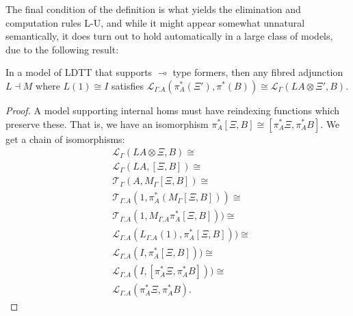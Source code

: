The final condition of the definition is what yields the elimination and computation rules L-U, and while it might appear somewhat unnatural semantically, it does turn out to hold automatically in a large class of models, due to the following result:
\begin{thm}In a model of LDTT that supports $\multimap$ type formers, then any fibred adjunction $L \dashv M$ where $L(1) \cong I$ satisfies $\mathcal{L}_{\Gamma.A}(\pi^*_A(\Xi'), \pi^*(B)) \cong \mathcal{L}_{\Gamma}(LA \otimes \Xi', B)$.
  \begin{proof}
    A model supporting internal homs must have reindexing functions which preserve these. That is, we have an isomorphism $\pi_A^*[\Xi, B] \cong [\pi_A^*\Xi, \pi^*_AB]$. We get a chain of isomorphisms:
\[
      \begin{split}
&        \mathcal{L}_{\Gamma}(LA \otimes \Xi, B) \cong \\
 &       \mathcal{L}_{\Gamma}(LA, [\Xi, B]) \cong \\
  &      \mathcal{T}_{\Gamma}(A, M_{\Gamma}[\Xi, B]) \cong \\
 &\mathcal{T}_{\Gamma.A}(1, \pi_A^*(M_{\Gamma}[\Xi, B])) \cong \\
 &\mathcal{T}_{\Gamma.A}(1, M_{\Gamma.A}\pi_A^*[\Xi, B])) \cong \\
  &\mathcal{L}_{\Gamma.A}(L_{\Gamma.A}(1), \pi_A^*[\Xi, B])) \cong \\
 &\mathcal{L}_{\Gamma.A}(I, \pi_A^*[\Xi, B])) \cong \\
 &\mathcal{L}_{\Gamma.A}(I, [\pi_A^*\Xi, \pi_A^*B])) \cong \\
 &\mathcal{L}_{\Gamma.A}(\pi_A^*\Xi, \pi_A^*B).
      \end{split}
\]
  \end{proof}
\end{thm}
